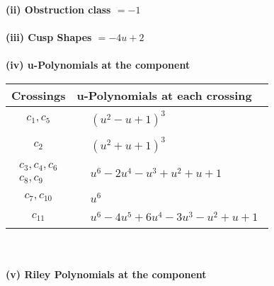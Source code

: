 \documentclass[1p]{elsarticle_modified}
\theoremstyle{definition}
\begin{document}
\flushleft \textbf{(ii) Obstruction class $= -1$}\\~\\
\flushleft \textbf{(iii) Cusp Shapes $= -4 u+2$}\\~\\
\newpage\renewcommand{\arraystretch}{1}
\flushleft \textbf{(iv) u-Polynomials at the component}\newline \\
\begin{tabular}{m{50pt}|m{274pt}}
Crossings & \hspace{64pt}u-Polynomials at each crossing \\
\hline $$\begin{aligned}c_{1},c_{5}\end{aligned}$$&$\begin{aligned}
&(u^2- u+1)^3
\end{aligned}$\\
\hline $$\begin{aligned}c_{2}\end{aligned}$$&$\begin{aligned}
&(u^2+u+1)^3
\end{aligned}$\\
\hline $$\begin{aligned}c_{3},c_{4},c_{6}\\c_{8},c_{9}\end{aligned}$$&$\begin{aligned}
&u^6-2 u^4- u^3+u^2+u+1
\end{aligned}$\\
\hline $$\begin{aligned}c_{7},c_{10}\end{aligned}$$&$\begin{aligned}
&u^6
\end{aligned}$\\
\hline $$\begin{aligned}c_{11}\end{aligned}$$&$\begin{aligned}
&u^6-4 u^5+6 u^4-3 u^3- u^2+u+1
\end{aligned}$\\
\hline
\end{tabular}\\~\\
\newpage\renewcommand{\arraystretch}{1}
\flushleft \textbf{(v) Riley Polynomials at the component}\newline \\
\end{document}
